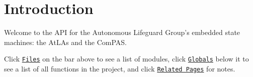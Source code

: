 \hypertarget{index_intro_sec}{}\section{Introduction}\label{index_intro_sec}
Welcome to the A\-P\-I for the Autonomous Lifeguard Group's embedded state machines\-: the At\-L\-As and the Com\-P\-A\-S.

Click \href{files.html}{\tt Files} on the bar above to see a list of modules, click \href{globals.html}{\tt Globals} below it to see a list of all functions in the project, and click \href{pages.html}{\tt Related Pages} for notes. 